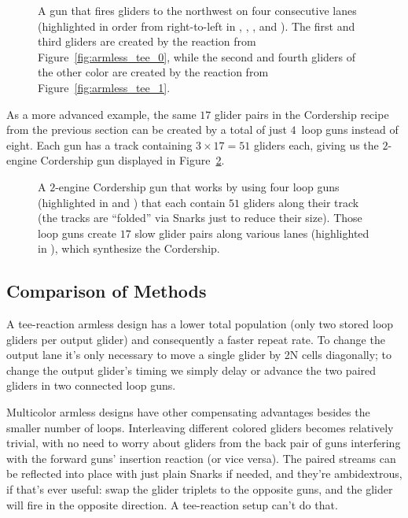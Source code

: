 \begin{figure}[!htb]
	\centering
	\caption{A gun that fires gliders to the northwest on four consecutive lanes (highlighted in order from right-to-left in , , , and ). The first and third gliders are created by the reaction from Figure~\ref{fig:armless_tee_0}, while the second and fourth gliders of the other color are created by the reaction from Figure~\ref{fig:armless_tee_1}.}\label{fig:armless_4_lane_gun}
\end{figure}

As a more advanced example, the same $17$ glider pairs in the Cordership recipe from the previous section can be created by a total of just $4$~loop guns instead of eight.  Each gun has a track containing $3 \times 17 = 51$ gliders each, giving us the $2$-engine Cordership gun displayed in Figure~\ref{fig:armless_cordership_gun}.

\begin{figure}[!htb]
	\centering
	\caption{A $2$-engine Cordership gun that works by using four loop guns (highlighted in  and ) that each contain $51$ gliders along their track (the tracks are ``folded'' via Snarks just to reduce their size). Those loop guns create $17$ slow glider pairs along various lanes (highlighted in ), which synthesize the Cordership.}\label{fig:armless_cordership_gun}
\end{figure}

\subsection{Comparison of Methods}\label{sec:method_compare}

A tee-reaction armless design has a lower total population (only two stored loop gliders per output glider) and consequently a faster repeat rate.  To change the output lane it's only necessary to move a single glider by 2N cells diagonally; to change the output glider's timing we simply delay or advance the two paired gliders in two connected loop guns.

Multicolor armless designs have other compensating advantages besides the smaller number of loops. Interleaving different colored gliders becomes relatively trivial, with no need to worry about gliders from the back pair of guns interfering with the forward guns' insertion reaction (or vice versa). The paired streams can be reflected into place with just plain Snarks if needed, and they're ambidextrous, if that's ever useful:  swap the glider triplets to the opposite guns, and the glider will fire in the opposite direction. A tee-reaction setup can't do that.

